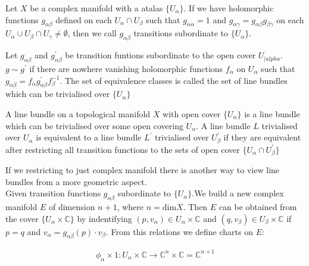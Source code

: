 \documentclass{article}
\begin{document}
\begin{df}
    Let $X$ be a complex manifold with a atalas $\{U_{\alpha}\}$. If we have holomorphic
    functions $g_{\alpha \beta}$ defined on each ${U_{\alpha}\cap U_{\beta}}$ such that 
    $g_{\alpha\alpha} = 1$ and $g_{\alpha \gamma} = g_{\alpha \beta} g_{\beta \gamma}$ 
    on  each $U_{\alpha}\cup U_{\beta}\cap U_{\gamma} \neq \emptyset$, then we call 
    ${g_{\alpha\beta}}$ transitions subordinate to $\{U_{\alpha}\}$.

\end{df}

\begin{df}
    Let $g_{\alpha \beta }$ and $g_{\alpha \beta}^{'}$ be transition funtions subordinate
    to the open cover ${U_{|alpha}}$. $g\sim g^{'} $ if there are nowhere vanishing holomorphic functions
    $f_{\alpha}$ on ${U_{\alpha}}$ such that $g_{\alpha \beta } = f_{\alpha} g_{\alpha \beta}^{'} f_{\beta}^{-1}$.
    The set of equivalence classes is called the set of line bundles which can be trivialised over $\{U_{\alpha}\}$

    
\end{df}

\begin{df}
    A line bundle on a topological manifold $X$ with open cover $\{U_{\alpha}\}$ is a line bundle which can 
    be trivialised over some open covering ${U_{\alpha}}$. A line bundle $L$ trivialised over ${U_{\alpha}}$
    is equivalent to a line bundle $L^{'}$ trivialised over ${U_{\beta}^{'}}$ if they are equivalent
    after restricting all transition functions to the sets of open cover $\{U_{\alpha}\cap U_{\beta}^{'}\}$  
    
\end{df}

If we restricting to just complex manifold there is another way 
to view line bundles from a more geometric aspect. \\

Given transition functions $g_{\alpha\beta}$ subordinate to $\{ U_{\alpha}\}$.We build a new complex manifold
$E$ of dimension $ n +1$, where $n = \text{dim} X$. Then $E$ can be obtained
from the cover $\{U_{\alpha} \times \mathbb{C}\}$ by indentifying $(p,v_{\alpha}) \in 
U_{\alpha} \times \mathbb{C}$ and $(q,v_{\beta}) \in U_{\beta} \times \mathbb{C}$
 if $p = q$ and $v_{\alpha} = g_{\alpha\beta}(p) \cdot v_{\beta}$.
From this relations we define charts on $E$:

\begin{align*}
    \phi_{\alpha} \times 1 : U_{\alpha} \times \mathbb{C} \longrightarrow \mathbb{C}^{n} \times \mathbb{C} = \mathbb{C}^{n+1} 
\end{align*}
\end{document}
